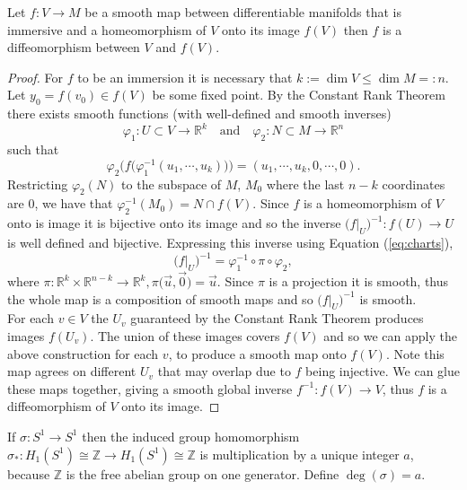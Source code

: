 \begin{lemma}\label{lem:embediffdiff}
Let $f:V\to M$ be a smooth map between differentiable manifolds that is immersive and a homeomorphism of $V$ onto its image $f(V)$ then $f$ is a diffeomorphism between $V$ and $f(V)$.
\end{lemma}
\begin{proof}
For $f$ to be an immersion it is necessary that $k := \dim V \leq \dim M =: n$. Let $y_0 = f(v_0) \in f(V)$ be some fixed point. By the Constant Rank Theorem there exists smooth functions (with well-defined and smooth inverses)
$$\varphi_1:U\subset V \to \mathbb{R}^k \quad \text{and} \quad \varphi_2:N\subset M \to \mathbb{R}^n$$ 
such that 
\begin{equation}\label{eq:charts}
\varphi_2\big(f\big(\varphi_1^{-1}(u_1,\cdots,u_k)\big)\big) = (u_1,\cdots,u_k,0,\cdots,0).
\end{equation}
Restricting $\varphi_2(N)$ to the subspace of $M$, $M_0$ where the last $n-k$ coordinates are $0$, we have that $\varphi_2^{-1}(M_0) = N \cap f(V)$. 
Since $f$ is a homeomorphism of $V$ onto is image it is bijective onto its image and so the inverse $\big(f|_{U} \big)^{-1}:f(U)\to U$ is well defined and bijective. Expressing this inverse using Equation (\ref{eq:charts}),
$$\big(f|_{U} \big)^{-1} = \varphi_1^{-1} \circ \pi \circ \varphi_2,$$
where $\pi:\mathbb{R}^k \times \mathbb{R}^{n-k} \to \mathbb{R}^k, \pi\big(\vec{u},\vec{0}\big) = \vec{u}$. Since $\pi$ is a projection it is smooth, thus the whole map is a composition of smooth maps and so $\big(f|_{U} \big)^{-1}$ is smooth.\\
For each $v \in V$ the $U_v$ guaranteed by the Constant Rank Theorem produces images $f(U_v)$. The union of these images covers $f(V)$ and so we can apply the above construction for each $v$, to produce a smooth map onto $f(V)$. Note this map agrees on different $U_v$ that may overlap due to $f$ being injective. We can glue these maps together, giving a smooth global inverse $f^{-1}:f(V)\to V$, thus $f$ is a diffeomorphism of $V$ onto its image.
\end{proof}

\begin{definition}[Degree]
If $\sigma: S^1\to S^1$ then the induced group homomorphism $\sigma_*:H_1(S^1)\cong \mathbb{Z} \to H_1(S^1)\cong \mathbb{Z}$ is multiplication by a unique integer $a$, because $\mathbb{Z}$ is the free abelian group on one generator. Define $\operatorname{deg}(\sigma)=a$.
\end{definition}

